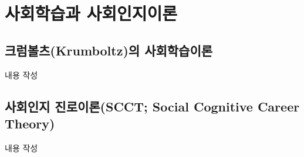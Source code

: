 \section{사회학습과 사회인지이론}

\subsection{크럼볼츠(Krumboltz)의 사회학습이론}
내용 작성

\subsection{사회인지 진로이론(SCCT; Social Cognitive Career Theory)}
내용 작성
